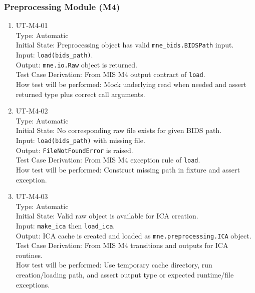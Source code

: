 \documentclass[12pt, titlepage]{article}
\begin{document}
\subsubsection{Preprocessing Module (M4)}

\begin{enumerate}

\item{UT-M4-01\\}
    Type: Automatic \\
    Initial State: Preprocessing object has valid \lstinline|mne_bids.BIDSPath| input. \\
    Input: \lstinline|load(bids_path)|. \\
    Output: \lstinline|mne.io.Raw| object is returned. \\
    Test Case Derivation: From MIS M4 output contract of \lstinline|load|. \\
    How test will be performed: Mock underlying read when needed and assert returned type plus correct call arguments.

\item{UT-M4-02\\}
    Type: Automatic \\
    Initial State: No corresponding raw file exists for given BIDS path. \\
    Input: \lstinline|load(bids_path)| with missing file. \\
    Output: \lstinline|FileNotFoundError| is raised. \\
    Test Case Derivation: From MIS M4 exception rule of \lstinline|load|. \\
    How test will be performed: Construct missing path in fixture and assert exception.

\item{UT-M4-03\\}
    Type: Automatic \\
    Initial State: Valid raw object is available for ICA creation. \\
    Input: \lstinline|make_ica| then \lstinline|load_ica|. \\
    Output: ICA cache is created and loaded as \lstinline|mne.preprocessing.ICA| object. \\
    Test Case Derivation: From MIS M4 transitions and outputs for ICA routines. \\
    How test will be performed: Use temporary cache directory, run creation/loading path, and assert output type or expected runtime/file exceptions.

\end{enumerate}
\end{document}
